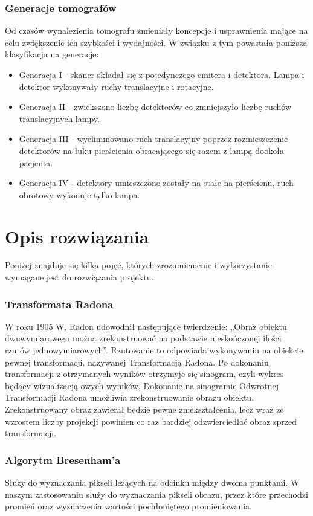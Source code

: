 \documentclass[A_4paper,12pt]{article}
\begin{document}
\subsubsection{Generacje tomografów}
Od czasów wynalezienia tomografu zmieniały koncepcje i usprawnienia mające na celu zwiększenie ich szybkości i wydajności.
W związku z tym powastała poniższa klasyfikacja na generacje:
\begin{itemize}
\item Generacja I - skaner składał się z pojedynczego emitera i detektora. Lampa i detektor wykonywały ruchy translacyjne i rotacyjne.
\item Generacja II - zwiekszono liczbę detektorów co zmniejszyło liczbę ruchów translacyjnych lampy.
\item Generacja III - wyeliminowano ruch translacyjny poprzez rozmieszczenie detektorów na łuku pierścienia obracającego się razem z lampą dookoła pacjenta.
\item Generacja IV - detektory umieszczone zostały na stałe na pierścienu, ruch obrotowy wykonuje tylko lampa.
\end{itemize}

\section{Opis rozwiązania}
Poniżej znajduje się kilka pojęć, których zrozumienienie i wykorzystanie wymagane jest do rozwiązania projektu.
\subsubsection{Transformata Radona}
W roku 1905 W. Radon udowodnił następujące twierdzenie: „Obraz obiektu dwuwymiarowego można zrekonstruować na podstawie nieskończonej ilości rzutów jednowymiarowych”. Rzutowanie to odpowiada wykonywaniu na obiekcie pewnej transformacji, nazywanej Transformacją Radona.
Po dokonaniu transformacji z otrzymanych wyników otrzymyje się sinogram, czyli wykres będący wizualizacją owych wyników.
Dokonanie na sinogramie Odwrotnej Transformacji Radona umożliwia zrekonstruowanie obrazu obiektu. Zrekonstruowany obraz zawierał będzie pewne zniekształcenia, lecz wraz ze wzrostem liczby projekcji powinien co raz bardziej odzwierciedlać obraz sprzed transformacji.

\subsubsection{Algorytm Bresenham'a}
Służy do wyznaczania pikseli leżących na odcinku między dwoma punktami. W naszym zastosowaniu służy do wyznaczania pikseli obrazu, przez które przechodzi promień oraz wyznaczenia wartości pochłoniętego promieniowania.
\end{document}
